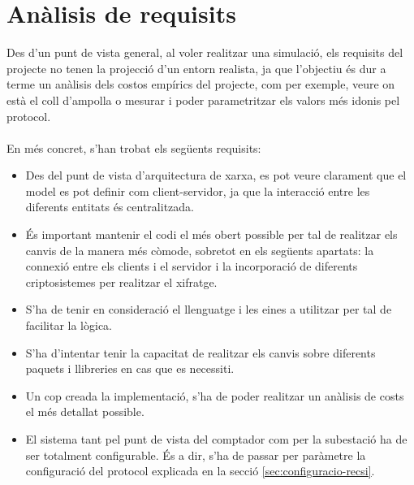 \newcommand{\java}{Java 8}
\newcommand{\mavenLarge}{Apache Maven 3.6.3}
\newcommand{\maven}{\texttt{maven} }
\newcommand{\ciglib}{\texttt{CigLib} }
\newcommand{\toml}{\texttt{Toml}}
\newcommand{\dto}{\texttt{DTO} }
\newcommand{\factoryDTO}{\texttt{FactorySMSDatagram} }


\section{Anàlisis de requisits}
Des d'un punt de vista general, al voler realitzar una simulació, els requisits del projecte no tenen la projecció d'un entorn realista, ja que l'objectiu és dur a terme un anàlisis dels costos empírics del projecte, com per exemple, veure on està el coll d'ampolla o mesurar i poder parametritzar els valors més idonis pel protocol.
\\
\\
En més concret, s'han trobat els següents requisits:
\begin{itemize}
	\item Des del punt de vista d'arquitectura de xarxa, es pot veure clarament que el model es pot definir com client-servidor, ja que la interacció entre les diferents entitats és centralitzada.
	\item És important mantenir el codi el més obert possible per tal de realitzar els canvis de la manera més còmode, sobretot en els següents apartats: la connexió entre els clients i el servidor i la incorporació de diferents criptosistemes per realitzar el xifratge.
	\item S'ha de tenir en consideració el llenguatge i les eines a utilitzar per tal de facilitar la lògica.
	\item S'ha d'intentar tenir la capacitat de realitzar els canvis sobre diferents paquets i llibreries en cas que es necessiti.
	\item Un cop creada la implementació, s'ha de poder realitzar un anàlisis de costs el més detallat possible.
	\item El sistema tant pel punt de vista del comptador com per la subestació ha de ser totalment configurable. És a dir, s'ha de passar per paràmetre la configuració del protocol explicada en la secció \ref{sec:configuracio-recsi}.
\end{itemize}
